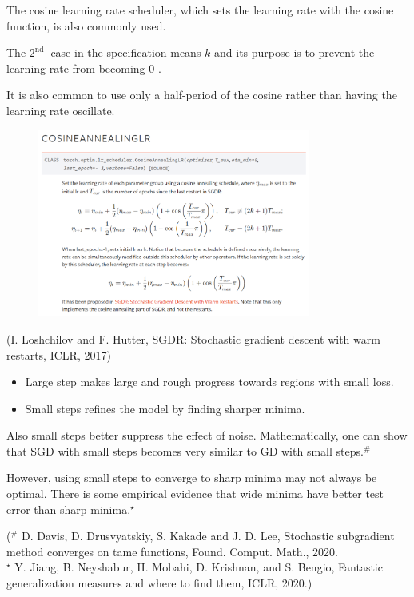 \begin{concept}
    The cosine learning rate scheduler, which sets the learning rate with the cosine function, is also commonly used.

    The $2^{\text {nd }}$ case in the specification means $k$ and its purpose is to prevent the learning rate from becoming 0 .

    It is also common to use only a half-period of the cosine rather than having the learning rate oscillate.

    \begin{figure}[H]
        \centering
        \includegraphics[width=0.8\textwidth]{.././assets/6.10.png}
    \end{figure}

    (I. Loshchilov and F. Hutter, SGDR: Stochastic gradient descent with warm restarts, ICLR, 2017)
\end{concept}

\begin{concept}
    \begin{itemize}
        \item Large step makes large and rough progress towards regions with small loss.
        \item Small steps refines the model by finding sharper minima.
    \end{itemize}

    Also small steps better suppress the effect of noise. Mathematically, one can show that SGD with small steps becomes very similar to GD with small steps.${ }^{\#}$

    However, using small steps to converge to sharp minima may not always be optimal. There is some empirical evidence that wide minima have better test error than sharp minima.${ }^{\star}$

    (${ }^{\#}$ D. Davis, D. Drusvyatskiy, S. Kakade and J. D. Lee, Stochastic subgradient method converges on tame functions, Found. Comput. Math., 2020.\\
    ${ }^{\star}$ Y. Jiang, B. Neyshabur, H. Mobahi, D. Krishnan, and S. Bengio, Fantastic generalization measures and where to find them, ICLR, 2020.)
\end{concept}

